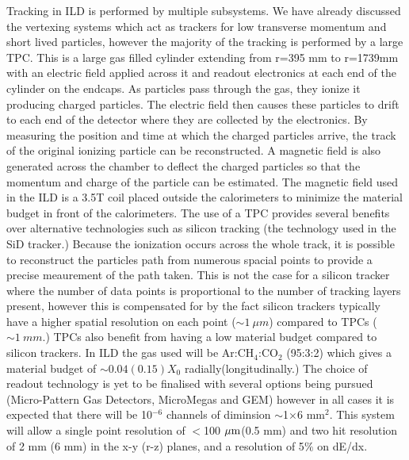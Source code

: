 Tracking in \ac{ILD} is performed by multiple subsystems. We have already discussed the vertexing systems which act as trackers for low transverse momentum and short lived particles, however the majority of the tracking is performed by a large \ac{TPC}.  This is a large gas filled cylinder extending from r=395 mm to r=1739mm with an electric field applied across it and readout electronics at each end of the cylinder on the endcaps. As particles pass through the gas, they ionize it producing charged particles. The electric field then causes these particles to drift to each end of the detector where they are collected by the electronics. By measuring the position and time at which the charged particles arrive, the track of the original ionizing particle can be reconstructed. A magnetic field is also generated across the chamber to deflect the charged particles so that the momentum and charge of the particle can be estimated. The magnetic field used in the ILD is a 3.5T coil placed outside the calorimeters to minimize the material budget in front of the calorimeters. The use of a \ac{TPC} provides several benefits over alternative technologies such as silicon tracking (the technology used in the \ac{SiD} tracker.) Because the ionization occurs across the whole track, it is possible to reconstruct the particles path from numerous spacial points to provide a precise meaurement of the path taken. This is not the case for a silicon tracker where the number of data points is proportional to the number of tracking layers present, however this is compensated for by the fact silicon trackers typically have a higher spatial resolution on each point ($\sim 1~\mu m$) compared to TPCs ($\sim 1~mm$.) TPCs also benefit from having a low material budget compared to silicon trackers. In \ac{ILD} the gas used will be Ar:CH$_{4}$:CO$_{2}$ (95:3:2) which gives a material budget of $\sim 0.04(0.15)X_0$ radially(longitudinally.) The choice of readout technology is yet to be finalised with several options being pursued (Micro-Pattern Gas Detectors, MicroMegas\cite{Giomataris:1995fq} and GEM\cite{Sauli:1997qp}) however in all cases it is expected that there will be 10${^{-6}}$ channels of diminsion $\sim$1$\times$6 mm$^{2}$. This system will allow a single point resolution of $<$100$~\mu\textrm{m}$(0.5 mm) and two hit resolution of 2 mm (6 mm)  in the x-y (r-z) planes, and a resolution of 5$\%$ on dE/dx.

